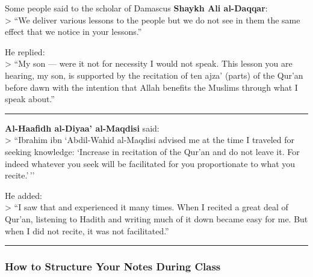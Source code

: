 \documentclass[
  a4paper,
  DIV=11,
  numbers=noendperiod]{scrartcl}
\begin{document}
\begin{tcolorbox}[enhanced jigsaw, left=2mm, colframe=quarto-callout-tip-color-frame, bottomrule=.15mm, titlerule=0mm, toprule=.15mm, opacityback=0, breakable, toptitle=1mm, colbacktitle=quarto-callout-tip-color!10!white, rightrule=.15mm, title=\textcolor{quarto-callout-tip-color}{\faLightbulb}\hspace{0.5em}{Reflections from the Scholars}, arc=.35mm, bottomtitle=1mm, leftrule=.75mm, opacitybacktitle=0.6, colback=white, coltitle=black]

Some people said to the scholar of Damascus \textbf{Shaykh Ali
al-Daqqar}:\\
\textgreater{} ``We deliver various lessons to the people but we do not
see in them the same effect that we notice in your lessons.''

He replied:\\
\textgreater{} ``My son --- were it not for necessity I would not speak.
This lesson you are hearing, my son, is supported by the recitation of
ten ajza' (parts) of the Qur'an before dawn with the intention that
Allah benefits the Muslims through what I speak about.''

\begin{center}\rule{0.5\linewidth}{0.5pt}\end{center}

\textbf{Al-Haafidh al-Diyaa' al-Maqdisi} said:\\
\textgreater{} ``Ibrahim ibn `Abdil-Wahid al-Maqdisi advised me at the
time I traveled for seeking knowledge: `Increase in recitation of the
Qur'an and do not leave it. For indeed whatever you seek will be
facilitated for you proportionate to what you recite.'\,''

He added:\\
\textgreater{} ``I saw that and experienced it many times. When I
recited a great deal of Qur'an, listening to Hadith and writing much of
it down became easy for me. But when I did not recite, it was not
facilitated.''

\end{tcolorbox}

\begin{center}\rule{0.5\linewidth}{0.5pt}\end{center}

\subsubsection{How to Structure Your Notes During
Class}\label{how-to-structure-your-notes-during-class}
\end{document}
